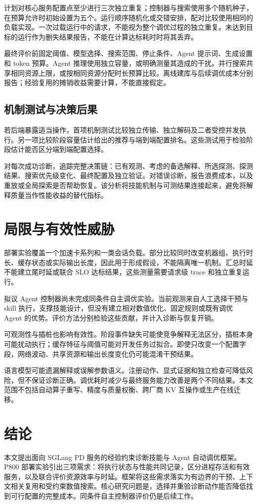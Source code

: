 \documentclass[UTF8,11pt,a4paper,fontset=windows]{ctexart}
\begin{document}
计划对核心服务配置点至少进行三次独立重复；控制器与搜索使用多个随机种子，在预算允许时初始设置为五个。运行顺序随机化或交错安排，配对比较使用相同的负载实现。一次过载运行中的请求，不能视为整个调优过程的独立重复。未达到目标的运行作为删失结果报告，不能在计算达标耗时时将其丢弃。

最终评价前固定阈值、模型选择、搜索范围、停止条件、Agent 提示词、生成设置和 token 预算。Agent 推理使用独立容量，或明确测量其造成的干扰。并行搜索共享相同资源上限，或按相同资源分配时长预算比较。离线建库与后续调优成本分别报告；经验复用的摊销收益需要计算，不能直接假定。

\subsection{机制测试与决策后果}
若后端暴露适当操作，首项机制测试比较独立传输、独立解码及二者受控并发执行。另一项比较阶段容量估计给出的推荐与端到端配置排名。这些测试用于检验阶段估计能否区分端到端配置选择。

对每次成功诊断，追踪完整决策链：已有观测、考虑的备选解释、所选探测、探测结果、搜索优先级变化、最终配置及独立验证。对错误诊断，报告浪费成本，以及重放或全局探索是否帮助恢复。该分析将技能机制与可测结果连接起来，避免将解释质量当作性能收益的替代指标。



\section{局限与有效性威胁}
部署实验覆盖一个加速卡系列和一类会话负载。部分比较同时改变机器组、执行时长、缓存状态或实际输出长度，因此用于形成假设，不能隔离唯一机制。汇总时延不能建立尾时延或联合 SLO 达标结果，这些测量需要请求级 trace 和独立重复运行。

拟议 Agent 控制器尚未完成同条件自主调优实验。当前观测来自人工选择干预与 skill 执行，支撑技能设计，但没有建立相对数值优化、固定规则或既有调优 Agent 的优势。评价方法分别检验这些贡献，并计入诊断与恢复开销。

可观测性与插桩也影响有效性。阶段事件缺失可能使竞争解释无法区分，插桩本身可能扰动执行；缓存特征与阈值可能对开发任务过拟合。即使只改变一个配置字段，网络波动、共享资源和输出长度变化仍可能混淆干预结果。

语言模型可能遗漏解释或误解参数语义。注册动作、显式证据和独立检查可降低风险，但不保证诊断正确。调优耗时减少与最终服务能力改善是两个不同结果。本文范围不包括自动算子重写、精度与质量权衡、跨厂商 KV 互操作或生产在线迁移。

\section{结论}
本文提出面向 SGLang PD 服务的经验约束诊断技能与 Agent 自动调优框架。P800 部署实验引出三项需求：将执行状态与性能共同记录，区分进程存活和有效服务，以及联合评价资源效率与时延。框架将这些需求落实为有边界的干预、上下文相关复用和受约束数值搜索。核心研究问题是，选择并重验诊断动作能否降低找到可行配置的完整成本。同条件自主控制器评价仍是后续工作。



{\small
{}
\setlength{\bibsep}{5pt plus 1pt minus 1pt}


}
\end{document}
